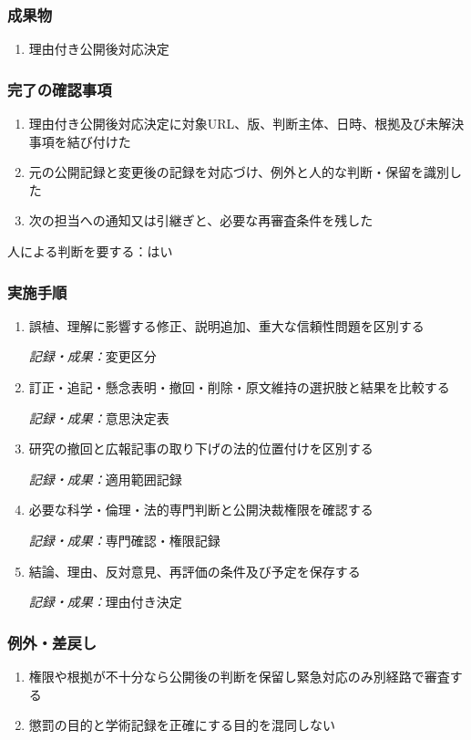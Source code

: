 \documentclass[a4paper,11pt]{article}
\begin{document}
\subsubsection*{成果物}
\begin{enumerate}[leftmargin=2em,itemsep=0.35em]
\item 理由付き公開後対応決定
\end{enumerate}
\subsubsection*{完了の確認事項}
\begin{enumerate}[leftmargin=2em,itemsep=0.35em]
\item 理由付き公開後対応決定に対象URL、版、判断主体、日時、根拠及び未解決事項を結び付けた
\item 元の公開記録と変更後の記録を対応づけ、例外と人的な判断・保留を識別した
\item 次の担当への通知又は引継ぎと、必要な再審査条件を残した
\end{enumerate}
\par 人による判断を要する：はい\par\medskip
\subsubsection*{実施手順}
\begin{enumerate}[leftmargin=2em,itemsep=0.65em]
\item 誤植、理解に影響する修正、説明追加、重大な信頼性問題を区別する\par\noindent\textit{記録・成果：}変更区分\nobreak\smallskip
\item 訂正・追記・懸念表明・撤回・削除・原文維持の選択肢と結果を比較する\par\noindent\textit{記録・成果：}意思決定表\nobreak\smallskip
\item 研究の撤回と広報記事の取り下げの法的位置付けを区別する\par\noindent\textit{記録・成果：}適用範囲記録\nobreak\smallskip
\item 必要な科学・倫理・法的専門判断と公開決裁権限を確認する\par\noindent\textit{記録・成果：}専門確認・権限記録\nobreak\smallskip
\item 結論、理由、反対意見、再評価の条件及び予定を保存する\par\noindent\textit{記録・成果：}理由付き決定\nobreak\smallskip
\end{enumerate}
\subsubsection*{例外・差戻し}
\begin{enumerate}[leftmargin=2em,itemsep=0.35em]
\item 権限や根拠が不十分なら公開後の判断を保留し緊急対応のみ別経路で審査する
\item 懲罰の目的と学術記録を正確にする目的を混同しない
\end{enumerate}
\end{document}
